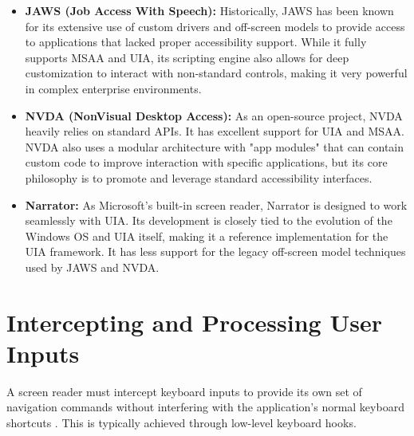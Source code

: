\begin{itemize}
	\item \textbf{JAWS (Job Access With Speech):} Historically, JAWS has been known for its extensive use of custom drivers and off-screen models to provide access to applications that lacked proper accessibility support. While it fully supports MSAA and UIA, its scripting engine also allows for deep customization to interact with non-standard controls, making it very powerful in complex enterprise environments.
	\item \textbf{NVDA (NonVisual Desktop Access):} As an open-source project, NVDA heavily relies on standard APIs. It has excellent support for UIA and MSAA. NVDA also uses a modular architecture with "app modules" that can contain custom code to improve interaction with specific applications, but its core philosophy is to promote and leverage standard accessibility interfaces.
	\item \textbf{Narrator:} As Microsoft's built-in screen reader, Narrator is designed to work seamlessly with UIA. Its development is closely tied to the evolution of the Windows OS and UIA itself, making it a reference implementation for the UIA framework. It has less support for the legacy off-screen model techniques used by JAWS and NVDA.
\end{itemize}

\section{Intercepting and Processing User Inputs}
\label{sec:intercepting-and-processing-user-inputs}

A screen reader must intercept keyboard inputs to provide its own set of navigation commands without interfering with the application's normal keyboard shortcuts \cite{WSRKeystrokeCompendium}. This is typically achieved through low-level keyboard hooks.

